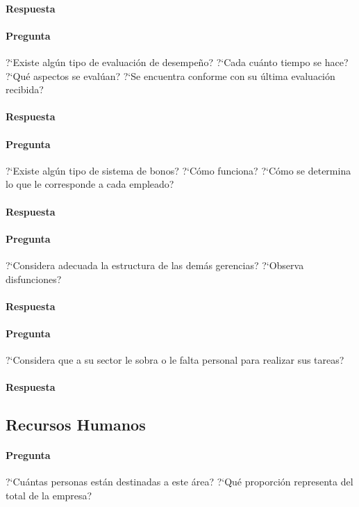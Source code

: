 \documentclass[12pt,a4paper,spanish]{article}
\begin{document}
	\paragraph{Respuesta}

	\paragraph{Pregunta}
	 ?`Existe alg\'un tipo de evaluaci\'on de desempe\~{n}o?  ?`Cada cu\'anto tiempo se hace?  ?`Qu\'e aspectos se eval\'uan?  ?`Se encuentra conforme con su \'ultima evaluaci\'on recibida?
	\paragraph{Respuesta}

	\paragraph{Pregunta}
	 ?`Existe alg\'un tipo de sistema de bonos?  ?`C\'omo funciona?  ?`C\'omo se determina lo que le corresponde a cada empleado?
	\paragraph{Respuesta}

	\paragraph{Pregunta}
	 ?`Considera adecuada la estructura de las dem\'as gerencias?  ?`Observa disfunciones?
	\paragraph{Respuesta}

	\paragraph{Pregunta}
	 ?`Considera que a su sector le sobra o le falta personal para realizar sus tareas?
	\paragraph{Respuesta}

\subsection{Recursos Humanos}
	\paragraph{Pregunta}
	 ?`Cu\'antas personas est\'an destinadas a este \'area?  ?`Qu\'e proporci\'on representa del total de la empresa?
\end{document}
